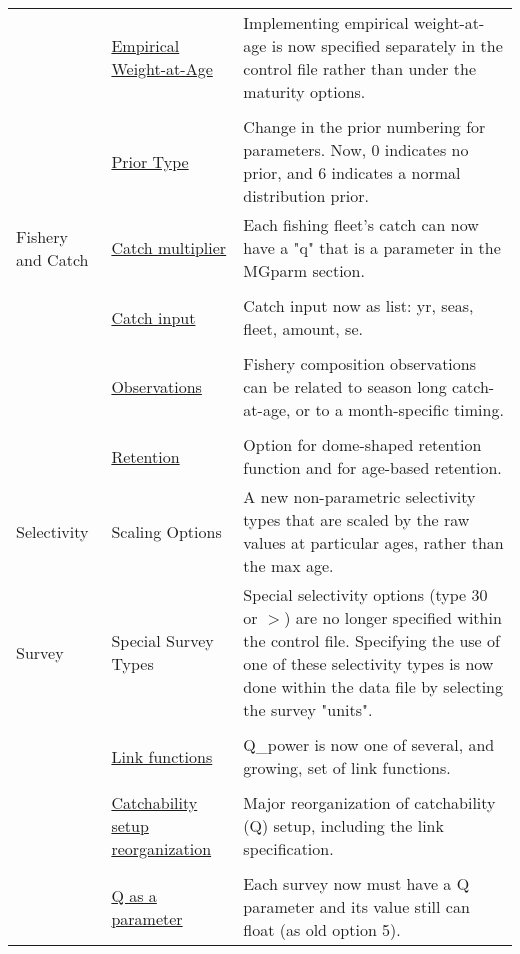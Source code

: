 \begin{center}
\begin{longtable}{p{2cm} p{3cm} p{10cm}}
				  \\
				  & \hyperlink{WAAparm} {Empirical Weight-at-Age} & Implementing empirical weight-at-age is now specified separately in the control file rather than under the maturity options.\\
				  \\
				  & \hyperlink{Priors}{Prior Type} & Change in the prior numbering for parameters.  Now, 0 indicates no prior, and 6 indicates a normal distribution prior.\\
				\hline
				Fishery and Catch & 
					\hyperlink{CatchMult}{Catch multiplier} & 
						Each fishing fleet's catch can now have a "q" that is a parameter in the MGparm section.\\
				  \\						
					& \hyperlink{CatchFormat}{Catch input} & 
						Catch input now as list:  yr, seas, fleet, amount, se. \\
				  \\						
					& \hyperlink{CompTiming}{Observations} & 
						Fishery composition observations can be related to season long catch-at-age, or to a month-specific timing.\\
				  \\					
					& \hyperlink{DomeRetention}{Retention} & 
						Option for dome-shaped retention function and for age-based retention. \\
				\hline
				Selectivity 
					& Scaling Options & 	
						A new non-parametric selectivity types that are scaled by the raw values at particular ages, rather than the max age.\\
				Survey
					& Special Survey Types & 
						Special selectivity options (type 30 or $>$) are no longer specified within the control file.  Specifying the use of one of these selectivity types is now done within the data file by selecting the survey "units". \\  
				  \\
					& \hyperlink{Qsetup}{Link functions} & 
						Q\_power is now one of several, and growing, set of link functions. \\
				  \\						
					& \hyperlink{Qsetup}{Catchability setup reorganization} & 
						Major reorganization of catchability (Q) setup, including the link specification. \\
				  \\					
					& \multicolumn{1}{l}{\hyperlink{Qsetup}{Q as a parameter}} & 
						Each survey now must have a Q parameter and its value still can float (as old option 5).\\

\end{longtable}
\end{center}
